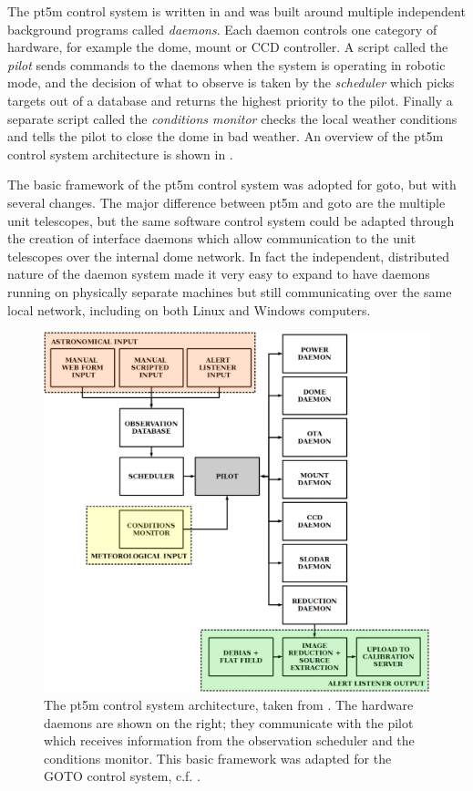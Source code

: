 \begin{colsection}
\begin{colsection}
The \gls{pt5m} control system is written in  and was built around multiple independent background programs called \emph{daemons}. Each daemon controls one category of hardware, for example the dome, mount or CCD controller. A script called the \emph{pilot} sends commands to the daemons when the system is operating in robotic mode, and the decision of what to observe is taken by the \emph{scheduler} which picks targets out of a database and returns the highest priority to the pilot. Finally a separate script called the \emph{conditions monitor} checks the local weather conditions and tells the pilot to close the dome in bad weather. An overview of the pt5m control system architecture is shown in .

The basic framework of the pt5m control system was adopted for \gls{goto}, but with several changes. The major difference between \gls{pt5m} and \gls{goto} are the multiple unit telescopes, but the same software control system could be adapted through the creation of interface daemons which allow communication to the unit telescopes over the internal dome network. In fact the independent, distributed nature of the daemon system made it very easy to expand to have daemons running on physically separate machines but still communicating over the same local network, including on both Linux and Windows computers.

\begin{figure}[p]
\begin{center}
\includegraphics[width=\linewidth]{images/pt5m_software.png}
\end{center}
\caption[The pt5m control system architecture]{The \gls{pt5m} control system architecture, taken from \citet{pt5m}. The hardware daemons are shown on the right; they communicate with the pilot which receives information from the observation scheduler and the conditions monitor. This basic framework was adapted for the GOTO control system, c.f. .}
\label{fig:pt5m_software}
\end{figure}


\end{colsection}
\end{colsection}
